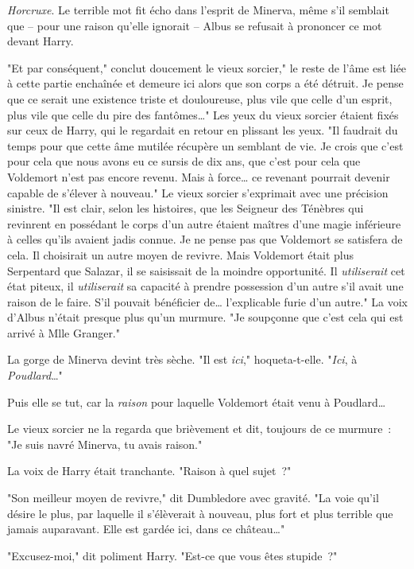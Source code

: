 \emph{Horcruxe}. Le terrible mot fit écho dans l'esprit de Minerva, même s'il semblait que -- pour une raison qu'elle ignorait -- Albus se refusait à prononcer ce mot devant Harry.

"Et par conséquent," conclut doucement le vieux sorcier," le reste de l'âme est liée à cette partie enchaînée et demeure ici alors que son corps a été détruit. Je pense que ce serait une existence triste et douloureuse, plus vile que celle d'un esprit, plus vile que celle du pire des fantômes…" Les yeux du vieux sorcier étaient fixés sur ceux de Harry, qui le regardait en retour en plissant les yeux. "Il faudrait du temps pour que cette âme mutilée récupère un semblant de vie. Je crois que c'est pour cela que nous avons eu ce sursis de dix ans, que c'est pour cela que Voldemort n'est pas encore revenu. Mais à force… ce revenant pourrait devenir capable de s'élever à nouveau." Le vieux sorcier s'exprimait avec une précision sinistre. "Il est clair, selon les histoires, que les Seigneur des Ténèbres qui revinrent en possédant le corps d'un autre étaient maîtres d'une magie inférieure à celles qu'ils avaient jadis connue. Je ne pense pas que Voldemort se satisfera de cela. Il choisirait un autre moyen de revivre. Mais Voldemort était plus Serpentard que Salazar, il se saisissait de la moindre opportunité. Il \emph{utiliserait} cet état piteux, il \emph{utiliserait} sa capacité à prendre possession d'un autre s'il avait une raison de le faire. S'il pouvait bénéficier de… l'explicable furie d'un autre." La voix d'Albus n'était presque plus qu'un murmure. "Je soupçonne que c'est cela qui est arrivé à Mlle Granger."

La gorge de Minerva devint très sèche. "Il est \emph{ici}," hoqueta-t-elle. "\emph{Ici}, à \emph{Poudlard}…"

Puis elle se tut, car la \emph{raison} pour laquelle Voldemort était venu à Poudlard…

Le vieux sorcier ne la regarda que brièvement et dit, toujours de ce murmure~: "Je suis navré Minerva, tu avais raison."

La voix de Harry était tranchante. "Raison à quel sujet~?"

"Son meilleur moyen de revivre," dit Dumbledore avec gravité. "La voie qu'il désire le plus, par laquelle il s'élèverait à nouveau, plus fort et plus terrible que jamais auparavant. Elle est gardée ici, dans ce château…"

"Excusez-moi," dit poliment Harry. "Est-ce que vous êtes stupide~?"


